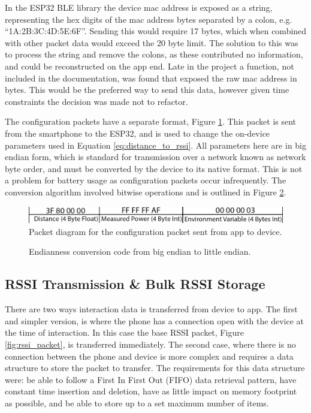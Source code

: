 \documentclass{l4proj}
\begin{document}
In the ESP32 BLE library the device mac address is exposed as a string, representing the hex digits of the mac address bytes separated by a colon, e.g. “1A:2B:3C:4D:5E:6F”. Sending this would require 17 bytes, which when combined with other packet data would exceed the 20 byte limit. The solution to this was to process the string and remove the colons, as these contributed no information, and could be reconstructed on the app end. Late in the project a function, not included in the documentation, was found that exposed the raw mac address in bytes. This would be the preferred way to send this data, however given time constraints the decision was made not to refactor.

The configuration packets have a separate format, Figure \ref{fig:config_packet}. This packet is sent from the smartphone to the ESP32, and is used to change the on-device parameters used in Equation \ref{eq:distance_to_rssi}. All parameters here are in big endian form, which is standard for transmission over a network known as network byte order, and must be converted by the device to its native format. This is not a problem for battery usage as configuration packets occur infrequently. The conversion algorithm involved bitwise operations and is outlined in Figure \ref{cde:conversion}.

\begin{figure}[!htb]
    \centering
    \includegraphics[width=1.0\linewidth]{images/config_packet.png}

    \caption{ Packet diagram for the configuration packet sent from app to device. }

    \label{fig:config_packet}
\end{figure}

\begin{figure}[!htb]
    
    \caption{ Endianness conversion code from big endian to little endian. }
    \label{cde:conversion}
\end{figure}

\subsection{RSSI Transmission \& Bulk RSSI Storage}

There are two ways interaction data is transferred from device to app. The first and simpler version, is where the phone has a connection open with the device at the time of interaction. In this case the base RSSI packet, Figure \ref{fig:rssi_packet}, is transferred immediately. The second case, where there is no connection between the phone and device is more complex and requires a data structure to store the packet to transfer. The requirements for this data structure were: be able to follow a First In First Out (FIFO) data retrieval pattern, have constant time insertion and deletion, have as little impact on memory footprint as possible, and be able to store up to a set maximum number of items.
\end{document}

